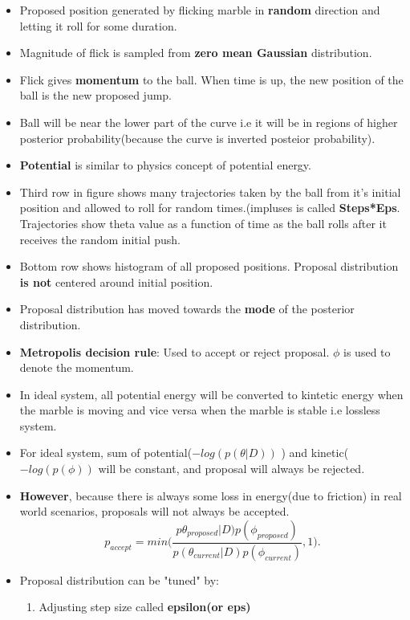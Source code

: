 \documentclass[a4paper]{article}
\begin{document}
\begin{itemize}
    \item Proposed position generated by flicking marble in \textbf{random} direction and letting it roll for some duration. 
    \item Magnitude of flick is sampled from \textbf{zero mean Gaussian } distribution. 
    \item Flick gives \textbf{momentum} to the ball. When time is up, the new position of the ball is the new proposed jump.
    \item Ball will be near the lower part of the curve i.e it will be in regions of higher posterior probability(because the curve is inverted posteior probability).
    \item \textbf{Potential} is similar to physics concept of potential energy. 
    \item Third row in figure shows many trajectories taken by the ball from it's initial position and allowed to roll for random times.(impluses is called \textbf{Steps*Eps}. Trajectories show theta value as a function of time as the ball rolls after it receives the random initial push.
    \item Bottom row shows histogram of all proposed positions. Proposal distribution \textbf{is not} centered around initial position. 
    \item Proposal distribution has moved towards the \textbf{mode} of the posterior distribution. 
    \item \textbf{Metropolis decision rule}: Used to accept or reject proposal. $\phi$ is used to denote the momentum.
    \item In ideal system, all potential energy will be converted to kintetic energy when the marble is moving and vice versa when the marble is stable i.e lossless system.
    \item For ideal system, sum of potential($-log(p(\theta|D))$ ) and kinetic($-log(p(\phi))$ will be constant, and proposal will always be rejected.
    \item \textbf{However}, because there is always some loss in energy(due to friction) in real world scenarios, proposals will not always be accepted. 
        \[
            p_{accept} = min\bigg(\frac{p\theta_{proposed}|D)p(\phi_{proposed})}{p(\theta_{current}|D)p(\phi_{current})}, 1\bigg)
        .\] 
    \item Proposal distribution can be "tuned" by:
    \begin{enumerate}
        \item Adjusting step size called \textbf{epsilon(or eps)}

\end{enumerate}
\end{itemize}
\end{document}
